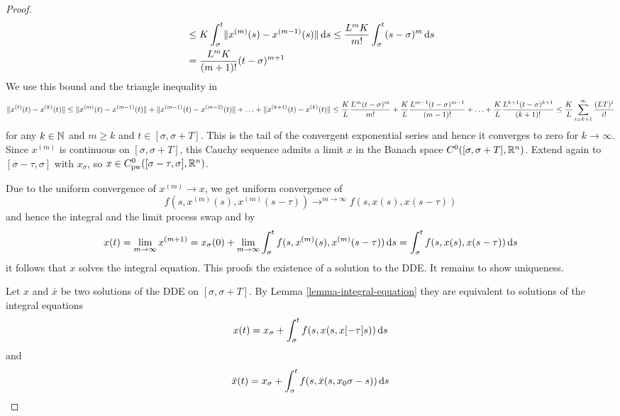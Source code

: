 \begin{proof}
\begin{align}
        & \leq K \int_\sigma^t \nnorm{x^{(m)}(s) - x^{(m-1)}(s)}\dx[s] \leq \frac{L^m K}{m!} \int_\sigma^t (s-\sigma)^m\dx[s]\\
        & = \frac{L^m K}{(m+1)!}(t-\sigma)^{m+1}
    \end{align}
    We use this bound and the triangle inequality in
    \begin{equation}
        \nnorm{x^{(t)}(t)-x^{(k)}(t)}\leq \nnorm{x^{(m)}(t)-x^{(m-1)}(t)} + \nnorm{x^{(m-1)}(t)-x^{(m-2)}(t)} +\ldots + \nnorm{x^{(k+1)}(t)-x^{(k)}(t)}\\
        \leq \frac{K}{L}\frac{L^m (t-\sigma)^m}{m!} + \frac{K}{L}\frac{L^{m-1} (t-\sigma)^{m-1}}{(m-1)!} +\ldots +\frac{K}{L}\frac{L^{k+1} (t-\sigma)^{k+1}}{(k+1)!}\\
        \leq \frac{K}{L}\sum_{i=k+1}^\infty \frac{(LT)^i}{i!}
    \end{equation}
    for any $k\in\N$ and $m\geq k$ and $t\in [\sigma,\sigma+T]$.
    This is the tail of the convergent exponential series and hence it converges to zero for $k\rightarrow\infty$.
    Since $x^{(m)}$ is continuous on $[\sigma,\sigma+T]$, this Cauchy sequence admits a limit $x$ in the Banach space $\continuouss[0]{[\sigma,\sigma+T]}{\R^n}$. Extend again to $[\sigma-\tau,\sigma]$ with $x_\sigma$, so $x\in\Cnpw[0]{[\sigma-\tau,\sigma]}{\R^n}$.


    Due to the uniform convergence of $x^(m)\rightarrow x$, we get uniform convergence of
    \begin{equation}
        f(s,x^{(m)}(s),x^{(m)}(s-\tau)) \rightarrow^{m\rightarrow\infty} f(s,x(s),x(s-\tau))
    \end{equation}
    and hence the integral and the limit process swap and by
    \begin{equation}
        x(t) = \lim_{m\rightarrow\infty} x^{(m+1)} = x_\sigma(0) + \lim_{m\rightarrow\infty}\int_\sigma^t f(s,x^{(m)}(s),x^{(m)}(s-\tau))\dx[s] = \int_\sigma^t f(s,x(s),x(s-\tau))\dx[s]
    \end{equation}
    it follows that $x$ solves the integral equation.
    This proofs the existence of a solution to the DDE. It remains to show uniqueness.

    Let $x$ and $\bar{x}$ be two solutions of the DDE on $[\sigma,\sigma+T]$.
    By Lemma \ref{lemma-integral-equation} they are equivalent to solutions of the integral equations
    \begin{equation}
        x(t) = x_\sigma + \int_\sigma^t f(s,x(s,\xtau{s}))\dx[s]
    \end{equation}
    and
    \begin{equation}
        \bar{x}(t) = x_\sigma + \int_\sigma^t f(s,\bar{x}(s,x_0{\sigma-s}))\dx[s]
    \end{equation}


\end{proof}
